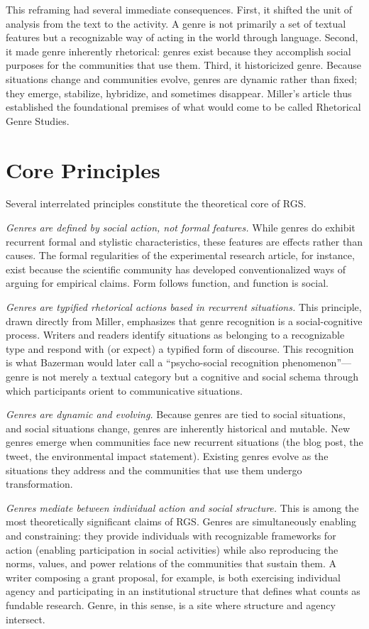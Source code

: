 \documentclass[12pt]{article}
\begin{document}
This reframing had several immediate consequences. First, it shifted the unit of analysis from the text to the activity. A genre is not primarily a set of textual features but a recognizable way of acting in the world through language. Second, it made genre inherently rhetorical: genres exist because they accomplish social purposes for the communities that use them. Third, it historicized genre. Because situations change and communities evolve, genres are dynamic rather than fixed; they emerge, stabilize, hybridize, and sometimes disappear. Miller's article thus established the foundational premises of what would come to be called Rhetorical Genre Studies.

\section{Core Principles}

Several interrelated principles constitute the theoretical core of RGS.

\textit{Genres are defined by social action, not formal features.} While genres do exhibit recurrent formal and stylistic characteristics, these features are effects rather than causes. The formal regularities of the experimental research article, for instance, exist because the scientific community has developed conventionalized ways of arguing for empirical claims. Form follows function, and function is social.

\textit{Genres are typified rhetorical actions based in recurrent situations.} This principle, drawn directly from Miller, emphasizes that genre recognition is a social-cognitive process. Writers and readers identify situations as belonging to a recognizable type and respond with (or expect) a typified form of discourse. This recognition is what Bazerman would later call a ``psycho-social recognition phenomenon''---genre is not merely a textual category but a cognitive and social schema through which participants orient to communicative situations.

\textit{Genres are dynamic and evolving.} Because genres are tied to social situations, and social situations change, genres are inherently historical and mutable. New genres emerge when communities face new recurrent situations (the blog post, the tweet, the environmental impact statement). Existing genres evolve as the situations they address and the communities that use them undergo transformation.

\textit{Genres mediate between individual action and social structure.} This is among the most theoretically significant claims of RGS. Genres are simultaneously enabling and constraining: they provide individuals with recognizable frameworks for action (enabling participation in social activities) while also reproducing the norms, values, and power relations of the communities that sustain them. A writer composing a grant proposal, for example, is both exercising individual agency and participating in an institutional structure that defines what counts as fundable research. Genre, in this sense, is a site where structure and agency intersect.
\end{document}
